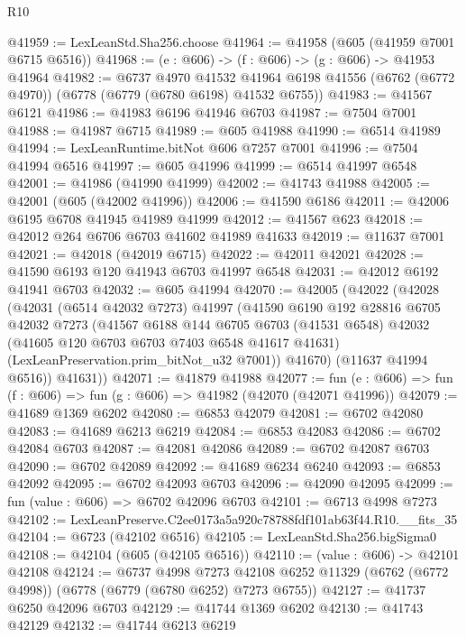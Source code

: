 \begin{lexlean}{R10}
\begin{coremodule}
@41959 := LexLeanStd.Sha256.choose
@41964 := @41958 (@605 (@41959 @7001 @6715 @6516))
@41968 := (e : @606) -> (f : @606) -> (g : @606) -> @41953 @41964
@41982 := @6737
    @4970
    @41532
    @41964
    @6198
    @41556
    (@6762 (@6772 @4970))
    (@6778 (@6779 (@6780 @6198) @41532 @6755))
@41983 := @41567 @6121
@41986 := @41983 @6196 @41946 @6703
@41987 := @7504 @7001
@41988 := @41987 @6715
@41989 := @605 @41988
@41990 := @6514 @41989
@41994 := LexLeanRuntime.bitNot @606 @7257 @7001
@41996 := @7504 @41994 @6516
@41997 := @605 @41996
@41999 := @6514 @41997 @6548
@42001 := @41986 (@41990 @41999)
@42002 := @41743 @41988
@42005 := @42001 (@605 (@42002 @41996))
@42006 := @41590 @6186
@42011 := @42006 @6195 @6708 @41945 @41989 @41999
@42012 := @41567 @623
@42018 := @42012 @264 @6706 @6703 @41602 @41989 @41633
@42019 := @11637 @7001
@42021 := @42018 (@42019 @6715)
@42022 := @42011 @42021
@42028 := @41590 @6193 @120 @41943 @6703 @41997 @6548
@42031 := @42012 @6192 @41941 @6703
@42032 := @605 @41994
@42070 := @42005
    (@42022
      (@42028
        (@42031
          (@6514 @42032 @7273)
          @41997
          (@41590
            @6190
            @192
            @28816
            @6705
            @42032
            @7273
            (@41567
              @6188
              @144
              @6705
              @6703
              (@41531 @6548)
              @42032
              (@41605 @120 @6703 @6703 @7403 @6548 @41617 @41631)
              (LexLeanPreservation.prim_bitNot_u32 @7001))
            @41670)
          (@11637 @41994 @6516))
        @41631))
@42071 := @41879 @41988
@42077 := fun (e : @606) => fun (f : @606) => fun (g : @606) => @41982 (@42070 (@42071 @41996))
@42079 := @41689 @1369 @6202
@42080 := @6853 @42079
@42081 := @6702 @42080
@42083 := @41689 @6213 @6219
@42084 := @6853 @42083
@42086 := @6702 @42084 @6703
@42087 := @42081 @42086
@42089 := @6702 @42087 @6703
@42090 := @6702 @42089
@42092 := @41689 @6234 @6240
@42093 := @6853 @42092
@42095 := @6702 @42093 @6703
@42096 := @42090 @42095
@42099 := fun (value : @606) => @6702 @42096 @6703
@42101 := @6713 @4998 @7273
@42102 := LexLeanPreserve.C2ee0173a5a920c78788fdf101ab63f44.R10.__fits_35
@42104 := @6723 (@42102 @6516)
@42105 := LexLeanStd.Sha256.bigSigma0
@42108 := @42104 (@605 (@42105 @6516))
@42110 := (value : @606) -> @42101 @42108
@42124 := @6737
    @4998
    @7273
    @42108
    @6252
    @11329
    (@6762 (@6772 @4998))
    (@6778 (@6779 (@6780 @6252) @7273 @6755))
@42127 := @41737 @6250 @42096 @6703
@42129 := @41744 @1369 @6202
@42130 := @41743 @42129
@42132 := @41744 @6213 @6219

\end{coremodule}
\end{lexlean}
